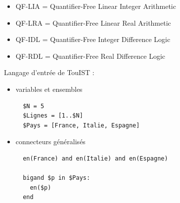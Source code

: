 \documentclass[english,french,usenames,dvipsnames]{beamer}
\begin{document}
\begin{frame}[containsverbatim]{\subsecname}
\begin{table}
\begin{tabular}{l|l|l}
    \end{tabular}
\end{table}
\vspace{0.5cm}
\begin{scriptsize}
\begin{itemize}
    \item[] QF-LIA = Quantifier-Free Linear Integer Arithmetic
    \item[] QF-LRA = Quantifier-Free Linear Real Arithmetic
    \item[] QF-IDL = Quantifier-Free Integer Difference Logic
    \item[] QF-RDL = Quantifier-Free Real Difference Logic
\end{itemize}
\end{scriptsize}
\end{frame}


\begin{frame}[containsverbatim]{\subsecname}
Langage d'entrée de TouIST :
\begin{itemize}
    \item \alert{variables} et \alert{ensembles} \\[5pt]
    \begin{small}\begin{verbatim}
  $N = 5
  $Lignes = [1..$N]
  $Pays = [France, Italie, Espagne]
    \end{verbatim}\end{small}
    \item \alert{connecteurs généralisés} \\[5pt]
    \begin{small}\begin{verbatim}
  en(France) and en(Italie) and en(Espagne)

  bigand $p in $Pays:
    en($p)
  end
    \end{verbatim}\end{small}
\end{itemize}
\end{frame}
\end{document}
